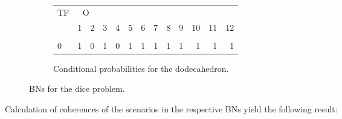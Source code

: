 \documentclass[10pt,]{scrartcl}
\begin{document}
\begin{figure}
{\begin{subfigure}[!ht]{0.7\textwidth}
\begin{table}[H]
\centering
\begin{tabular}{lrrrrrrrrrrrr}
\toprule
\multicolumn{1}{c}{TF} & \multicolumn{2}{c}{O} \\
  & 1 & 2 & 3 & 4 & 5 & 6 & 7 & 8 & 9 & 10 & 11 & 12\\
\midrule
\cellcolor{gray!6}{1} & \cellcolor{gray!6}{0} & \cellcolor{gray!6}{1} & \cellcolor{gray!6}{0} & \cellcolor{gray!6}{1} & \cellcolor{gray!6}{0} & \cellcolor{gray!6}{0} & \cellcolor{gray!6}{0} & \cellcolor{gray!6}{0} & \cellcolor{gray!6}{0} & \cellcolor{gray!6}{0} & \cellcolor{gray!6}{0} & \cellcolor{gray!6}{0}\\
0 & 1 & 0 & 1 & 0 & 1 & 1 & 1 & 1 & 1 & 1 & 1 & 1\\
\bottomrule
\end{tabular}
\end{table}
\caption{\large Conditional probabilities for the dodecahedron.}
\end{subfigure}} 
\caption{BNs for the \textsf{dice} problem.}
\label{fig:diceBN}
\end{figure}

\newpage

Calculation of coherences of the scenarios in the respective BNs yield
the following result:

\begin{table}[H]
\centering
{}
\end{table}

\begin{table}[H]
\centering
{}
\end{table}
\end{document}
